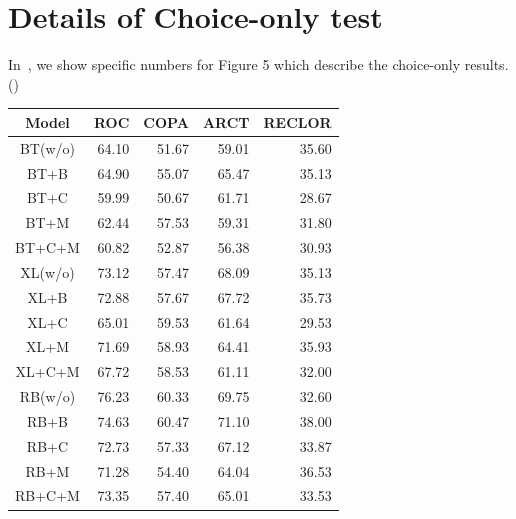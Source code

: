 \section{Details of Choice-only test}
In~, we show specific numbers for Figure 5 which describe 
the choice-only results. ()
\begin{table}[th]
\centering
\scriptsize
\begin{tabular}{c|rrrr}
\toprule
\textbf{Model} & \textbf{ROC} & \textbf{COPA} & \textbf{ARCT} & \textbf{RECLOR} \\ \midrule
BT(w/o)&64.10 &51.67 &59.01 &35.60 \\ \hline  
BT+B&64.90 &55.07 &65.47 &35.13 \\ \hline  
BT+C&59.99 &50.67 &61.71 &28.67 \\ \hline  
BT+M&62.44 &57.53 &59.31 &31.80 \\ \hline  
BT+C+M&60.82 &52.87 &56.38 &30.93 \\ \midrule 
XL(w/o)&73.12 &57.47 &68.09 &35.13 \\ \hline  
XL+B&72.88 &57.67 &67.72 &35.73 \\ \hline  
XL+C&65.01 &59.53 &61.64 &29.53 \\ \hline  
XL+M&71.69 &58.93 &64.41 &35.93 \\ \hline  
XL+C+M&67.72 &58.53 &61.11 &32.00 \\ \midrule 
RB(w/o)&76.23 &60.33 &69.75 &32.60 \\ \hline  
RB+B&74.63 &60.47 &71.10 &38.00 \\ \hline  
RB+C&72.73 &57.33 &67.12 &33.87 \\ \hline  
RB+M&71.28 &54.40 &64.04 &36.53 \\ \hline  
RB+C+M&73.35 &57.40 &65.01 &33.53 \\



\end{tabular}
\end{table}

